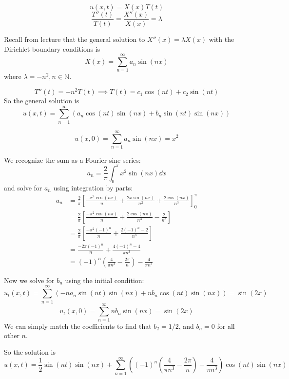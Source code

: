 \documentclass[plain]{pset}
\begin{document}
\begin{solution}
    \[u(x, t) = X(x)T(t)\]
    \[\frac{T''(t)}{T(t)} = \frac{X''(x)}{X(x)} = \lambda\]

    Recall from lecture that the general solution to \(X''(x) = \lambda X(x)\) with the Dirichlet boundary conditions is
    \[X(x) = \sum_{n=1}^\infty a_n \sin(nx)\]
    where \(\lambda = -n^2, n \in \mathbb{N}\).

    \[T''(t) = -n^2T(t) \implies T(t) = c_1\cos(nt) + c_2\sin(nt)\]
    So the general solution is
    \[u(x, t) = \sum_{n=1}^\infty \left(a_n \cos(nt)\sin(nx) + b_n \sin(nt)\sin(nx)\right)\]

    \[u(x, 0) = \sum_{n=1}^\infty a_n \sin(nx) = x^2\]

    We recognize the sum as a Fourier sine series:
    \[a_n = \frac{2}{\pi} \int_0^\pi x^2 \sin(nx) \dd x\]
    and solve for \(a_n\) using integration by parts:
    \begin{align*}
        a_n & = \frac{2}{\pi} \left[\frac{-x^2\cos(nx)}{n} + \frac{2x\sin(nx)}{n^2} + \frac{2\cos(nx)}{n^3}\right]_0^\pi \\
            & = \frac{2}{\pi} \left[\frac{-\pi^2\cos(n\pi)}{n} + \frac{2\cos(n\pi)}{n^3} - \frac{2}{n^3}\right]          \\
            & = \frac{2}{\pi} \left[\frac{-\pi^2(-1)^n}{n} + \frac{2(-1)^n - 2}{n^3}\right]                              \\
            & = \frac{-2\pi(-1)^n}{n} + \frac{4(-1)^n - 4}{\pi n^3}                                                      \\
            & = (-1)^n\left(\frac{4}{\pi n^3} - \frac{2\pi}{n}\right) - \frac{4}{\pi n^3}
    \end{align*}

    Now we solve for \(b_n\) using the initial condition:
    \[u_t(x, t) = \sum_{n=1}^\infty \left(-n a_n \sin(nt)\sin(nx) + n b_n \cos(nt)\sin(nx)\right) = \sin(2x)\]
    \[u_t(x, 0) = \sum_{n=1}^\infty n b_n \sin(nx) = \sin(2x)\]
    We can simply match the coefficients to find that \(b_2 = 1/2\), and \(b_n = 0\) for all other \(n\).

    So the solution is
    \[u(x, t) = \frac{1}{2}\sin(nt)\sin(nx) + \sum_{n=1}^\infty \left((-1)^n\left(\frac{4}{\pi n^3} - \frac{2\pi}{n}\right) - \frac{4}{\pi n^3}\right) \cos(nt)\sin(nx)\]


\end{solution}
\end{document}
